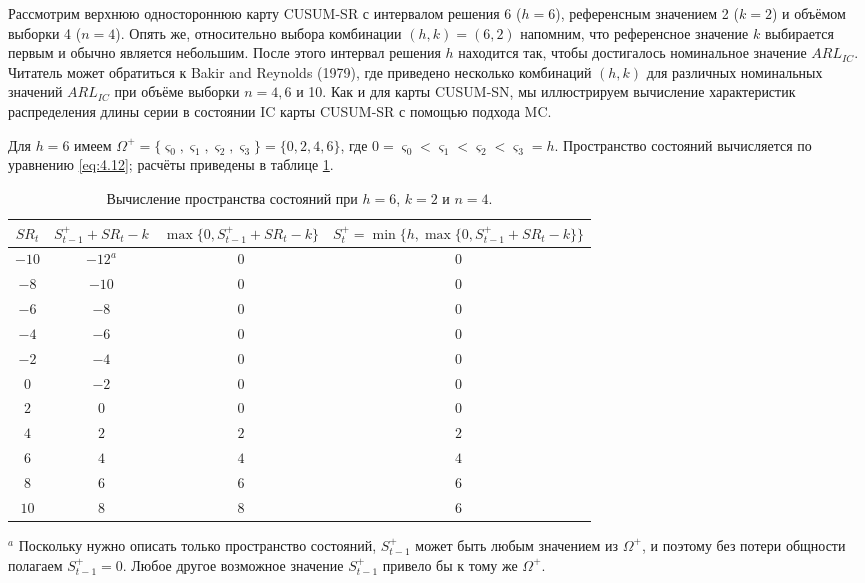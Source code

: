 Рассмотрим верхнюю одностороннюю карту CUSUM-SR с интервалом решения 6 (\(h = 6\)), референсным значением 2 (\(k = 2\)) и объёмом выборки 4 (\(n = 4\)). Опять же, относительно выбора комбинации \((h, k) = (6, 2)\) напомним, что референсное значение \(k\) выбирается первым и обычно является небольшим. После этого интервал решения \(h\) находится так, чтобы достигалось номинальное значение \(ARL_{IC}\). Читатель может обратиться к Bakir and Reynolds (1979), где приведено несколько комбинаций \((h, k)\) для различных номинальных значений \(ARL_{IC}\) при объёме выборки \(n = 4, 6\) и 10. Как и для карты CUSUM-SN, мы иллюстрируем вычисление характеристик распределения длины серии в состоянии IC карты CUSUM-SR с помощью подхода MC.

Для \(h = 6\) имеем \(\Omega^+ = \{\varsigma_0, \varsigma_1, \varsigma_2, \varsigma_3\} = \{0, 2, 4, 6\}\), где \(0 = \varsigma_0 < \varsigma_1 < \varsigma_2 < \varsigma_3 = h\). Пространство состояний вычисляется по уравнению \eqref{eq:4.12}; расчёты приведены в таблице \ref{tab:4.13}.

\begin{table}[!ht]
	\centering
	\caption{Вычисление пространства состояний при \(h = 6\), \(k = 2\) и \(n = 4\).}
	\label{tab:4.13}
	\small
	\begin{tabular}{@{}cccc@{}}\toprule
		\(SR_t\) & \(S_{t-1}^+ + SR_t - k\) & \(\max\{0, S_{t-1}^+ + SR_t - k\}\) & \(S_t^+ = \min\{h, \max\{0, S_{t-1}^+ + SR_t - k\}\}\) \\ \midrule
		\(-10\) & \(-12^{a}\) & \(0\) & \(0\) \\
		\(-8\) & \(-10\) & \(0\) & \(0\) \\
		\(-6\) & \(-8\) & \(0\) & \(0\) \\
		\(-4\) & \(-6\) & \(0\) & \(0\) \\
		\(-2\) & \(-4\) & \(0\) & \(0\) \\
		\(0\) & \(-2\) & \(0\) & \(0\) \\
		\(2\) & \(0\) & \(0\) & \(0\) \\
		\(4\) & \(2\) & \(2\) & \(2\) \\
		\(6\) & \(4\) & \(4\) & \(4\) \\
		\(8\) & \(6\) & \(6\) & \(6\) \\
		\(10\) & \(8\) & \(8\) & \(6\) \\ \bottomrule
	\end{tabular}
	\par\smallskip
	\footnotesize \(^{a}\) Поскольку нужно описать только пространство состояний, \(S_{t-1}^+\) может быть любым значением из \(\Omega^+\), и поэтому без потери общности полагаем \(S_{t-1}^+ = 0\). Любое другое возможное значение \(S_{t-1}^+\) привело бы к тому же \(\Omega^+\).
\end{table}

